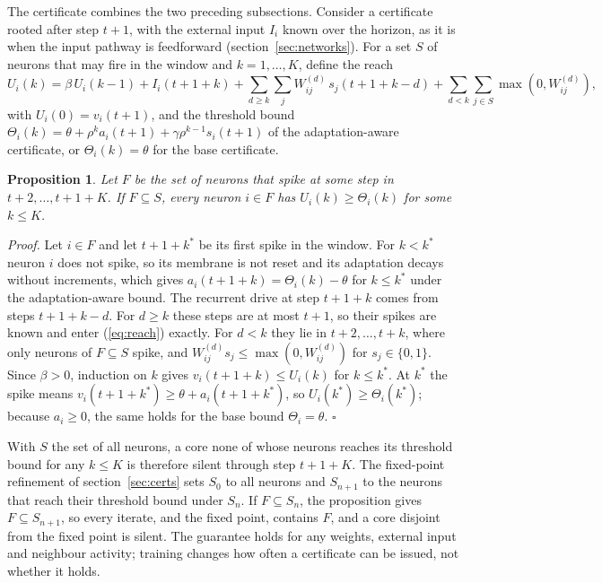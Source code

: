 \documentclass{iopjournal}
\newtheorem{proposition}{Proposition}
\begin{document}
The certificate combines the two preceding subsections. Consider a certificate rooted after step $t+1$, with the external input $I_i$ known over the horizon, as it is when the input pathway is feedforward (section~\ref{sec:networks}). For a set $S$ of neurons that may fire in the window and $k=1,\dots,K$, define the reach
\begin{equation}
U_i(k) = \beta\,U_i(k-1) + I_i(t+1+k) + \sum_{d\ge k}\sum_j W^{(d)}_{ij}\,s_j(t+1+k-d) + \sum_{d<k}\sum_{j\in S}\max\!\left(0,W^{(d)}_{ij}\right),
\label{eq:reach}
\end{equation}
with $U_i(0)=v_i(t+1)$, and the threshold bound $\Theta_i(k)=\theta+\rho^k a_i(t+1)+\gamma\rho^{k-1}s_i(t+1)$ of the adaptation-aware certificate, or $\Theta_i(k)=\theta$ for the base certificate.

\begin{proposition}\label{prop:sound}
Let $F$ be the set of neurons that spike at some step in $t+2,\dots,t+1+K$. If $F\subseteq S$, every neuron $i\in F$ has $U_i(k)\ge\Theta_i(k)$ for some $k\le K$.
\end{proposition}

\noindent\textit{Proof.} Let $i\in F$ and let $t+1+k^\ast$ be its first spike in the window. For $k<k^\ast$ neuron $i$ does not spike, so its membrane is not reset and its adaptation decays without increments, which gives $a_i(t+1+k)=\Theta_i(k)-\theta$ for $k\le k^\ast$ under the adaptation-aware bound. The recurrent drive at step $t+1+k$ comes from steps $t+1+k-d$. For $d\ge k$ these steps are at most $t+1$, so their spikes are known and enter (\ref{eq:reach}) exactly. For $d<k$ they lie in $t+2,\dots,t+k$, where only neurons of $F\subseteq S$ spike, and $W^{(d)}_{ij}s_j\le\max(0,W^{(d)}_{ij})$ for $s_j\in\{0,1\}$. Since $\beta>0$, induction on $k$ gives $v_i(t+1+k)\le U_i(k)$ for $k\le k^\ast$. At $k^\ast$ the spike means $v_i(t+1+k^\ast)\ge\theta+a_i(t+1+k^\ast)$, so $U_i(k^\ast)\ge\Theta_i(k^\ast)$; because $a_i\ge0$, the same holds for the base bound $\Theta_i=\theta$. $\square$

With $S$ the set of all neurons, a core none of whose neurons reaches its threshold bound for any $k\le K$ is therefore silent through step $t+1+K$. The fixed-point refinement of section~\ref{sec:certs} sets $S_0$ to all neurons and $S_{n+1}$ to the neurons that reach their threshold bound under $S_n$. If $F\subseteq S_n$, the proposition gives $F\subseteq S_{n+1}$, so every iterate, and the fixed point, contains $F$, and a core disjoint from the fixed point is silent. The guarantee holds for any weights, external input and neighbour activity; training changes how often a certificate can be issued, not whether it holds.
\end{document}

